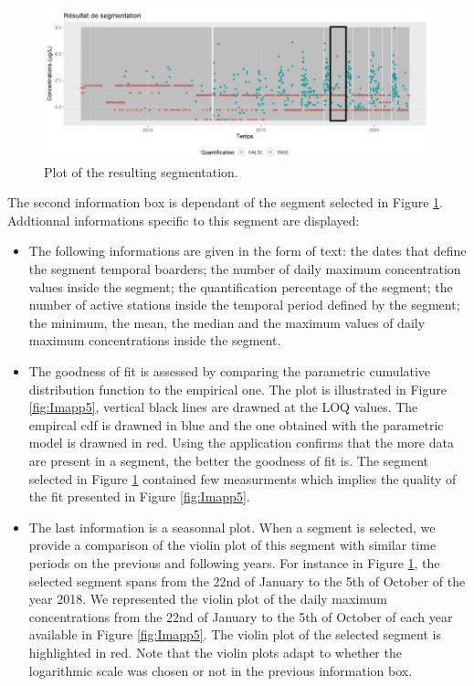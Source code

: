 \begin{itemize}
\begin{figure}[ht]
  \centering
  \includegraphics[]{figs/Chap6/Im_app4.pdf}
  \caption{Plot of the resulting segmentation.}
  \label{fig:Imapp4}
\end{figure}     
\end{itemize}  



The second information box is dependant of the segment selected in Figure \ref{fig:Imapp4}. Addtionnal informations specific to this segment are displayed:
\begin{itemize}
\item The following informations are given in the form of text: the dates that define the segment temporal boarders; the number of daily maximum concentration values inside the segment; the quantification percentage of the segment; the number of active stations inside the temporal period defined by the segment; the minimum, the mean, the median and the maximum values of daily maximum concentrations inside the segment. 
\item The goodness of fit is assessed by comparing the parametric cumulative distribution function to the empirical one. The plot is illustrated in Figure \ref{fig:Imapp5}, vertical black lines are drawned at the LOQ values. The empircal cdf is drawned in blue and the one obtained with the parametric model is drawned in red. Using the application confirms that the more data are present in a segment, the better the goodness of fit is. The segment selected in Figure \ref{fig:Imapp4} contained few measurments which implies the quality of the fit presented in Figure \ref{fig:Imapp5}. 
\item The last information is a seasonnal plot. When a segment is selected, we provide a comparison of the violin plot of this segment with similar time periods on the previous and following years. For instance in Figure \ref{fig:Imapp4}, the selected segment spans from the 22nd of January to the 5th of October of the year 2018. We represented the violin plot of the daily maximum concentrations from the 22nd of January to the 5th of October of each year available in Figure \ref{fig:Imapp5}. The violin plot of the selected segment is highlighted in red. Note that the violin plots adapt to whether the logarithmic scale was chosen or not in the previous information box.
\end{itemize}  

